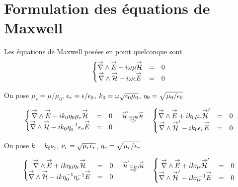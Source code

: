 \section{Formulation des équations de Maxwell}

Les équations de Maxwell posées en point quelconque sont
\begin{equation}
  \left\lbrace \begin{matrix}
  \vrot \vE + i\w\mu \vH &=& 0 \\
  \vrot \vH - i\w\eps \vE &=& 0 \\
  \end{matrix} \right.
\end{equation}

On pose \(\mu_r = \mu \slash \mu_0\), \(\eps_r = \eps \slash \eps_0\), \(k_0 = \w \sqrt {\eps_0\mu_0}\), \(\eta_0=\sqrt {\mu_0/\eps_0}\)

\begin{equation}
\left\lbrace \begin{matrix}
\vrot \vE + ik_0\eta_0\mu_r \vH &=& 0 \\
\vrot \vH - ik_0\eta_0^{-1}\eps_r \vE &=& 0 \\
\end{matrix} \right.
\quad
\overset{\vH' = \eta_0 \vH}{\Rightarrow}
\quad
\left\lbrace \begin{matrix}
\vrot \vE + ik_0\mu_r \vH' &=& 0 \\
\vrot \vH' - ik_0\eps_r \vE &=& 0 \\
\end{matrix} \right.
\end{equation}

On pose \(k=k_0\nu_r\), \(\nu_r = \sqrt{\mu_r\eps_r}\), \(\eta_r = \sqrt{\mu_r \slash \eps_r}\)

\begin{equation}
\left\lbrace \begin{matrix}
\vrot \vE + ik\eta_0\eta_r \vH &=& 0 \\
\vrot \vH - ik\eta_0^{-1}\eta_r^{-1} \vE &=& 0 \\
\end{matrix} \right.
\quad
\overset{\vH' = \eta_0 \vH}{\Rightarrow}
\quad
\left\lbrace \begin{matrix}
\vrot \vE + ik\eta_r \vH' &=& 0 \\
\vrot \vH' - ik\eta_r^{-1} \vE &=& 0 \\
\end{matrix} \right.
\end{equation}
